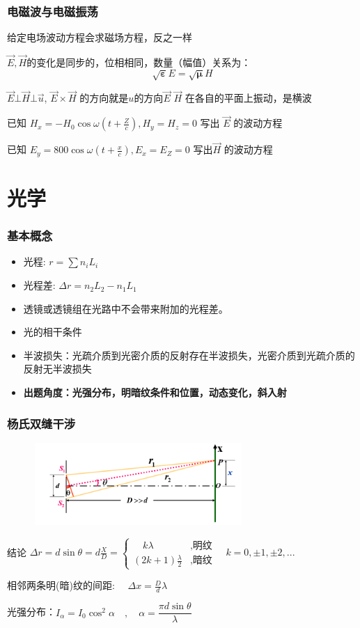 \documentclass[UTF8]{ctexbeamer}
\begin{document}
\begin{frame}
\frametitle{电磁波与电磁振荡}
给定电场波动方程会求磁场方程，反之一样

$\vec{E},\vec{H}$的变化是同步的，位相相同，数量（幅值）关系为：
$$\sqrt{\boldsymbol{\varepsilon}}E=\sqrt{\boldsymbol{\mu}}H$$

$\vec{E}\bot\vec{H}\bot\vec{u}$, $\vec{E}\times\vec{H}$ 的方向就是$u$的方向$\vec{E}$ $\vec{H}$ 在各自的平面上振动，是横波
\begin{examples}
	已知 $H_x=-H_0\cos\omega(t+\frac{{Z}}c),H_y=H_z=0$  写出 $\vec{E}$ 的波动方程
	
	已知 $E_y=800\cos\omega(t+\frac xc),E_x=E_Z=0$ 写出$\vec{H}$ 的波动方程
\end{examples} 
\end{frame}
\section{光学}
\begin{frame}
\frametitle{基本概念}
\begin{itemize}
	
	\item 光程: $r=\sum n_iL_i$
	
	\item 光程差: $\Delta r=n_2L_2-n_1L_1$
	
	\item 透镜或透镜组在光路中不会带来附加的光程差。
	
	\item 光的相干条件
	
	\item 半波损失：光疏介质到光密介质的反射存在半波损失，光密介质到光疏介质的反射无半波损失
	
	\item \textbf{出题角度：光强分布，明暗纹条件和位置，动态变化，斜入射}
\end{itemize}
\end{frame}
\begin{frame}
\frametitle{杨氏双缝干涉}
				\begin{figure}[!ht]
	\centering
	\includegraphics[width=0.7\textwidth]{12}
\end{figure}
\begin{block}{结论}
	$\Delta r=d\sin\theta=d\frac{X}{D}=\begin{cases}\quad k{\lambda}&\text{,明纹}\\(2k+1)\frac{\lambda}{2}&\text{,暗纹}\end{cases}\quad k=0,\pm1,\pm2,...$
	
	相邻两条明(暗)纹的间距: $\quad{\Delta x=\frac Dd\lambda}$
	
	光强分布：$I_\alpha=I_0\cos^2\alpha\quad,\quad\alpha=\dfrac{\pi d\sin\theta}\lambda$
\end{block}
\end{frame}
\end{document}
